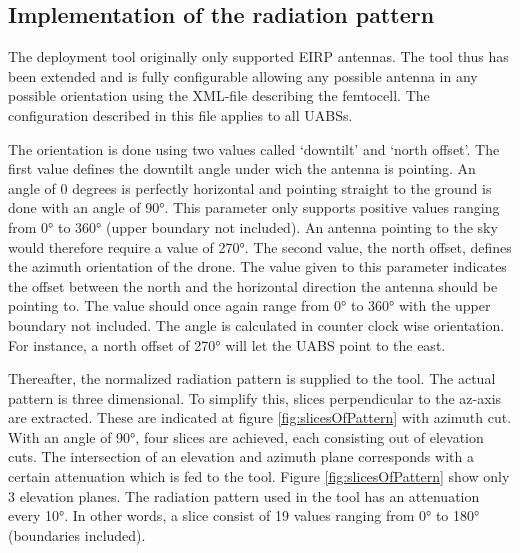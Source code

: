 \subsection{Implementation of the radiation pattern}
\label{subsec:implementationradpat}
The deployment tool originally only supported EIRP antennas. The tool thus has been extended and is fully configurable allowing any possible antenna in any possible 
orientation using the XML-file describing the femtocell. The configuration described in this file applies to all \gls{UABS}s. 

The orientation is done using two values called `downtilt' and `north offset'. The first value
defines the downtilt angle under wich the antenna is pointing. An angle of 0 degrees is perfectly horizontal and pointing straight to the ground is done with an angle of \ang{90}.
This parameter only supports positive values ranging from \ang{0} to \ang{360} (upper boundary not included). An antenna pointing to the sky would therefore require a value of \ang{270}.
The second value, the north offset, defines the azimuth orientation of the drone. The value given to this parameter indicates the offset between the north
and the horizontal direction the antenna should be pointing to. The value should once again range from \ang{0} to \ang{360} with the upper boundary not included. The
angle is calculated in counter clock wise orientation. For instance, a north offset of \ang{270} will let the \gls{UABS} point to the east.  

Thereafter, the normalized radiation pattern is supplied to the tool. The actual pattern is three dimensional. To simplify this,
slices perpendicular to the az-axis are extracted. These are indicated at figure \ref{fig:slicesOfPattern} with azimuth cut. With
an angle of \ang{90}, four slices are achieved, each consisting out of elevation cuts. The intersection of an elevation and azimuth plane 
corresponds with a certain attenuation which is fed to the tool. Figure \ref{fig:slicesOfPattern} show only 3 elevation planes. The radiation pattern used in the tool 
has an attenuation every \ang{10}. In other words, a slice consist of 19 values ranging from \ang{0} to \ang{180} (boundaries included).

